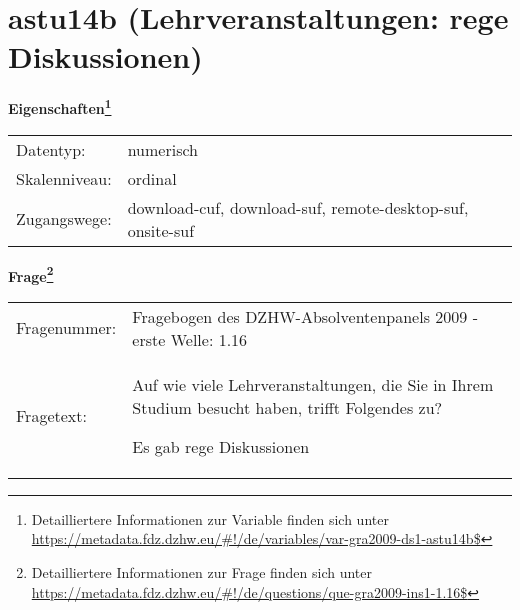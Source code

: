 
    \setcounter{footnote}{0}

    \vspace*{-1.8cm}
	\section{astu14b (Lehrveranstaltungen: rege Diskussionen)}
	\label{section:astu14b}



    \vspace*{0.5cm}
    \noindent\textbf{Eigenschaften\footnote{Detailliertere Informationen zur Variable finden sich unter
		\url{https://metadata.fdz.dzhw.eu/\#!/de/variables/var-gra2009-ds1-astu14b$}}}\\
	\begin{tabularx}{\hsize}{@{}lX}
	Datentyp: & numerisch \\
	Skalenniveau: & ordinal \\
	Zugangswege: &
	  download-cuf, 
	  download-suf, 
	  remote-desktop-suf, 
	  onsite-suf
 \\
    \end{tabularx}



				\vspace*{0.5cm}
                \noindent\textbf{Frage\footnote{Detailliertere Informationen zur Frage finden sich unter
		              \url{https://metadata.fdz.dzhw.eu/\#!/de/questions/que-gra2009-ins1-1.16$}}}\\
				\begin{tabularx}{\hsize}{@{}lX}
					Fragenummer: &
					  Fragebogen des DZHW-Absolventenpanels 2009 - erste Welle:
					  1.16
 \\
					Fragetext: & Auf wie viele Lehrveranstaltungen, die Sie in Ihrem Studium besucht haben, trifft Folgendes zu?\par  Es gab rege Diskussionen \\
				\end{tabularx}





